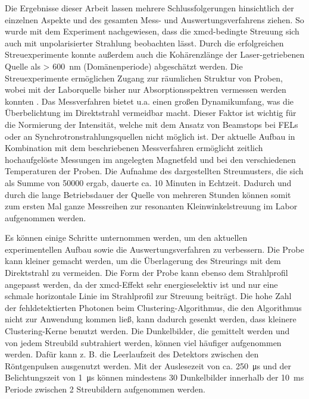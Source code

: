 \noindent
Die Ergebnisse dieser Arbeit lassen mehrere Schlussfolgerungen hinsichtlich der einzelnen Aspekte und des gesamten Mess- und Auswertungsverfahrens ziehen. So wurde mit dem Experiment nachgewiesen, dass die \gls{xmcd}-bedingte Streuung sich auch mit unpolarisierter Strahlung beobachten lässt. Durch die erfolgreichen Streuexperimente konnte außerdem auch die Kohärenzlänge der Laser-getriebenen Quelle als > \SI{600}{\nano\meter} (Domänenperiode) abgeschätzt werden. Die Streuexperimente ermöglichen Zugang zur räumlichen Struktur von Proben, wobei mit der Laborquelle bisher nur Absorptionsspektren vermessen werden konnten \cite{schick_laser-driven_2021}. Das Messverfahren bietet u.a. einen großen Dynamikumfang, was die Überbelichtung im Direktstrahl vermeidbar macht. Dieser Faktor ist wichtig für die Normierung der Intensität, welche mit dem Ansatz von Beamstops bei FELs oder an Synchrotronstrahlungsquellen nicht möglich ist. Der aktuelle Aufbau in Kombination mit dem beschriebenen Messverfahren ermöglicht zeitlich hochaufgelöste Messungen im angelegten Magnetfeld und bei den verschiedenen Temperaturen der Proben. Die Aufnahme des dargestellten Streumusters, die sich als Summe von \SI{50000}{\captures} ergab, dauerte ca. 10 Minuten in Echtzeit. Dadurch und durch die lange Betriebsdauer der Quelle von mehreren Stunden können somit zum ersten Mal ganze Messreihen zur resonanten Kleinwinkelstreuung im Labor aufgenommen werden.

\noindent
Es können einige Schritte unternommen werden, um den aktuellen experimentellen Aufbau sowie die Auswertungsverfahren zu verbessern. Die Probe kann kleiner gemacht werden, um die Überlagerung des Streurings mit dem Direktstrahl zu vermeiden. Die Form der Probe kann ebenso dem Strahlprofil angepasst werden, da der \gls{xmcd}-Effekt sehr energieselektiv ist und nur eine schmale horizontale Linie im Strahlprofil zur Streuung beiträgt. Die hohe Zahl der fehldetektierten Photonen beim Clustering-Algorithmus, die den Algorithmus nicht zur Anwendung kommen ließ, kann dadurch gesenkt werden, dass kleinere Clustering-Kerne benutzt werden. Die Dunkelbilder, die gemittelt werden und von jedem Streubild subtrahiert werden, können viel häufiger aufgenommen werden. Dafür kann z. B. die Leerlaufzeit des Detektors zwischen den Röntgenpulsen ausgenutzt werden. Mit der Auslesezeit von ca. \SI{250}{\micro\second} und der Belichtungszeit von \SI{1}{\micro\second} können mindestens 30 Dunkelbilder innerhalb der \SI{10}{\milli\second} Periode zwischen 2 Streubildern aufgenommen werden.

